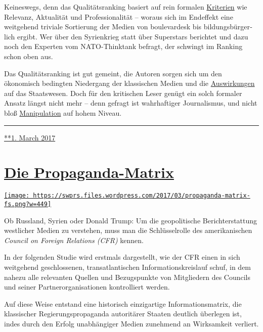 Keineswegs, denn das Qualitätsranking basiert auf rein formalen
\href{http://www.medienqualitaet-schweiz.ch/index.php/qualitaetsrating/}{Kriterien}
wie Relevanz, Aktualität und Professionalität -- woraus sich im
Endeffekt eine weitgehend triviale Sortierung der Medien von
boulevardesk bis bildungs­bürger­lich ergibt. Wer über den Syrienkrieg
statt über Superstars berichtet und dazu noch den Experten vom
NATO-Thinktank befragt, der schwingt im Ranking schon oben aus.

Das Qualitätsranking ist gut gemeint, die Autoren sorgen sich um den
ökonomisch bedingten Niedergang der klassischen Medien und die
\href{https://www.nzz.ch/feuilleton/medien/was-die-medien-fuer-die-schweizer-demokratie-leisten-ld.1416854}{Auswirkungen}
auf das Staatswesen. Doch für den kritischen Leser genügt ein solch
formaler Ansatz längst nicht mehr -- denn gefragt ist wahrhaftiger
Journalismus, und nicht bloß
\href{https://swprs.org/der-propaganda-schluessel/}{Manipulation} auf
hohem Niveau.

\begin{center}\rule{0.5\linewidth}{\linethickness}\end{center}

\href{https://swprs.org/2017/03/01/medienqualitaet/}{**1. March 2017}

\hypertarget{die-propaganda-matrix}{%
\section{\texorpdfstring{\href{https://swprs.org/2017/03/01/propaganda-matrix/}{Die
Propaganda-Matrix}}{Die Propaganda-Matrix}}\label{die-propaganda-matrix}}

\href{https://swprs.org/2017/03/01/propaganda-matrix/}{\texttt{[image: https://swprs.files.wordpress.com/2017/03/propaganda-matrix-fs.png?w=449]}}

Ob Russland, Syrien oder Donald Trump: Um die geopolitische
Bericht­erstattung westlicher Medien zu verstehen, muss man die
Schlüssel­rolle des amerikanischen \emph{Council on Foreign Relations
(CFR)} kennen.

In der folgenden Studie wird erstmals dargestellt, wie der CFR einen in
sich weitgehend geschlossenen, trans­atlantischen
Informations­­kreislauf schuf, in dem nahezu alle relevanten Quellen und
Bezugs­punkte von Mitgliedern des Councils und seiner
Partner­­organisationen kontrolliert werden.

Auf diese Weise entstand eine historisch einzigartige
Informations­­matrix, die klassischer Regierungs­propaganda autoritärer
Staaten deutlich überlegen ist, indes durch den Erfolg unabhängiger
Medien zunehmend an Wirksamkeit verliert.

